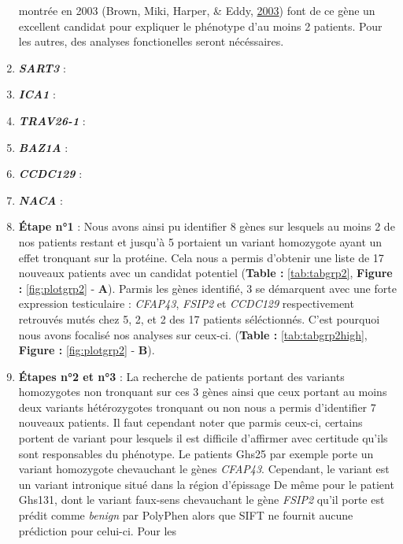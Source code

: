 \documentclass[12pt,twoside]{reedthesis}
\theoremstyle{definition}
\theoremstyle{definition}
\theoremstyle{remark}
\begin{document}
\begin{enumerate}
    montrée en 2003 (Brown, Miki, Harper, \& Eddy,
    \protect\hyperlink{ref-Brown2003}{2003}) font de ce gène un excellent
    candidat pour expliquer le phénotype d'au moins 2 patients. Pour les
    autres, des analyses fonctionelles seront nécéssaires.
  \item
    \textbf{\emph{SART3}} :\\
  \item
    \textbf{\emph{ICA1}} :\\
  \item
    \textbf{\emph{TRAV26-1}} :\\
  \item
    \textbf{\emph{BAZ1A}} :\\
  \item
    \textbf{\emph{CCDC129}} :\\
  \item
    \textbf{\emph{NACA}} :
  \item
    \textbf{Étape n°1} : Nous avons ainsi pu identifier 8 gènes sur
    lesquels au moins 2 de nos patients restant et jusqu'à 5 portaient un
    variant homozygote ayant un effet tronquant sur la protéine. Cela nous
    a permis d'obtenir une liste de 17 nouveaux patients avec un candidat
    potentiel (\textbf{Table :} \ref{tab:tabgrp2}, \textbf{Figure :}
    \ref{fig:plotgrp2} - \textbf{A}). Parmis les gènes identifié, 3 se
    démarquent avec une forte expression testiculaire : \emph{CFAP43},
    \emph{FSIP2} et \emph{CCDC129} respectivement retrouvés mutés chez 5,
    2, et 2 des 17 patients séléctionnés. C'est pourquoi nous avons
    focalisé nos analyses sur ceux-ci. (\textbf{Table :
    }\ref{tab:tabgrp2high}, \textbf{Figure :} \ref{fig:plotgrp2} -
    \textbf{B}).
  \item
    \textbf{Étapes n°2 et n°3} : La recherche de patients portant des
    variants homozygotes non tronquant sur ces 3 gènes ainsi que ceux
    portant au moins deux variants hétérozygotes tronquant ou non nous a
    permis d'identifier 7 nouveaux patients. Il faut cependant noter que
    parmis ceux-ci, certains portent de variant pour lesquels il est
    difficile d'affirmer avec certitude qu'ils sont responsables du
    phénotype. Le patients Ghs25 par exemple porte un variant homozygote
    chevauchant le gènes \emph{CFAP43}. Cependant, le variant est un
    variant intronique situé dans la région d'épissage De même pour le
    patient Ghs131, dont le variant faux-sens chevauchant le gène
    \emph{FSIP2} qu'il porte est prédit comme \emph{benign} par PolyPhen
    alors que SIFT ne fournit aucune prédiction pour celui-ci. Pour les

\end{enumerate}
\end{document}
